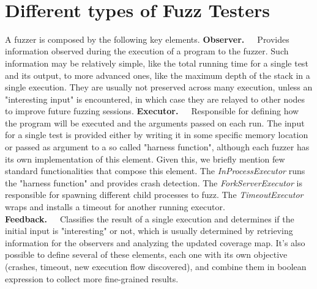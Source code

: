 \ \\ \newline \newline
{}



\newpage
\section{Different types of Fuzz Testers} \label{fuzzers}

A fuzzer is composed by the following key elements. \cite{afl_docs}
\newline \newline
\textbf{Observer.}\ \ \ Provides information observed during the execution of a program to the fuzzer. Such information may be relatively simple, like the total running time for a single test and its output, to more advanced ones, like the maximum depth of the stack in a single execution. They are usually not preserved across many execution, unless an "interesting input" is encountered, in which case they are relayed to other nodes to improve future fuzzing sessions. 
\newline \newline
\textbf{Executor.}\ \ \ Responsible for defining how the program will be executed and the arguments passed on each run. The input for a single test is provided either by writing it in some specific memory location or passed as argument to a so called "harness function", although each fuzzer has its own implementation of this element. Given this, we briefly mention few standard functionalities that compose this element. The \textit{InProcessExecutor} runs the "harness function" and provides crash detection. The \textit{ForkServerExecutor} is responsible for spawning different child processes to fuzz. The \textit{TimeoutExecutor} wraps and installs a timeout for another running executor.
\newline \newline
\textbf{Feedback.}\ \ \ Classifies the result of a single execution and determines if the initial input is "interesting" or not, which is usually determined by retrieving information for the observers and analyzing the updated coverage map. It's also possible to define several of these elements, each one with its own objective (crashes, timeout, new execution flow discovered), and combine them in boolean expression to collect more fine-grained results.
